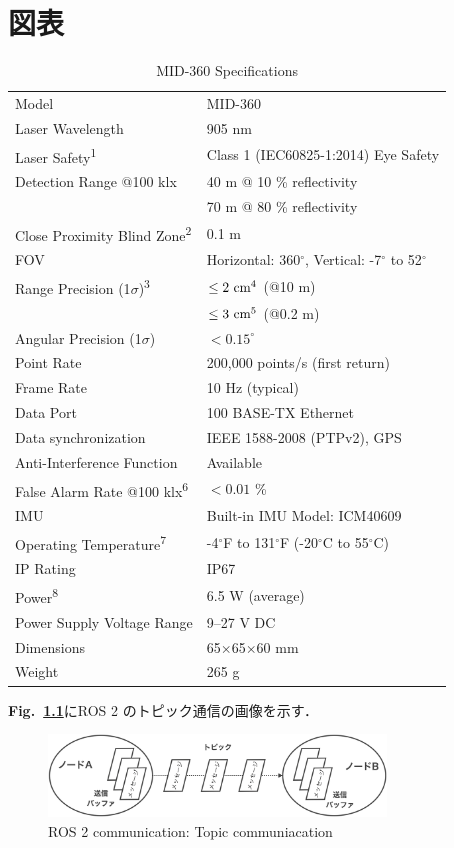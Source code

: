 \chapter{図表}\label{chap:chapter3}

\begin{table}[b]
    \centering
    \caption{MID-360 Specifications}
    \label{table:mid360_spec}
    \begin{tabular}{| p{} | p{} |}
    \hline
    Model & MID-360 \\
    Laser Wavelength & 905 nm \\
    Laser Safety\textsuperscript{1} & Class 1 (IEC60825-1:2014) Eye Safety \\
    Detection Range @100 klx & 40 m @ 10 \% reflectivity \\
                                    & 70 m @ 80 \% reflectivity \\
    Close Proximity Blind Zone\textsuperscript{2} & 0.1 m \\
    FOV & Horizontal: 360$^\circ$, Vertical: -7$^\circ$ to 52$^\circ$ \\
    Range Precision (1$\sigma$)\textsuperscript{3} & $\leq 2\text{ cm}\textsuperscript{4}$ (@10 m) \\
                                                            & $\leq 3\text{ cm}\textsuperscript{5}$ (@0.2 m) \\
    Angular Precision (1$\sigma$) & $< 0.15^\circ$ \\
    Point Rate & 200,000 points/s (first return) \\
    Frame Rate & 10 Hz (typical) \\
    Data Port & 100 BASE-TX Ethernet \\
    Data synchronization & IEEE 1588-2008 (PTPv2), GPS \\
    Anti-Interference Function & Available \\
    False Alarm Rate @100 klx\textsuperscript{6} & $< 0.01$ \% \\
    IMU & Built-in IMU Model: ICM40609 \\
    Operating Temperature\textsuperscript{7} & -4$^\circ$F to 131$^\circ$F (-20$^\circ$C to 55$^\circ$C) \\
    IP Rating & IP67 \\
    Power\textsuperscript{8} & 6.5 W (average) \\
    Power Supply Voltage Range & 9--27 V DC \\
    Dimensions & 65$\times$65$\times$60 mm \\
    Weight & 265 g \\
    \hline
    \end{tabular}
\end{table}

\clearpage

\textbf{Fig.~\ref{fig:topic_comm}}にROS 2 のトピック通信の画像を示す．

\begin{figure}[t]
    \centering
    \includegraphics[width=0.8\textwidth]{fig/topic_comm.png}
    \caption{ROS 2 communication: Topic communiacation }
    \label{fig:topic_comm}
\end{figure}
